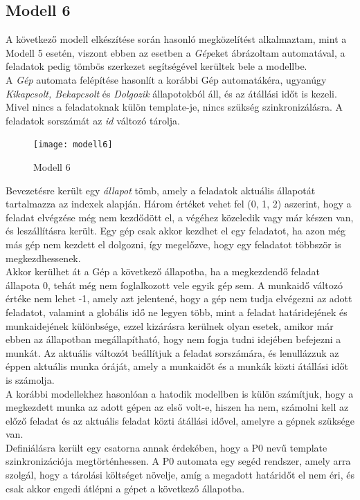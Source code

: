 \documentclass [12pt]{report}
\begin{document}
\subsection{Modell 6}
A következő modell elkészítése során hasonló megközelítést alkalmaztam, mint a Modell 5 esetén, viszont ebben az esetben a \emph{Gép}eket ábrázoltam automatával, a feladatok pedig tömbös szerkezet segítségével kerültek bele a modellbe.\\
A \emph{Gép} automata felépítése hasonlít a korábbi Gép automatákéra, ugyanúgy \emph{Kikapcsolt, Bekapcsolt} és \emph{Dolgozik} állapotokból áll, és az átállási időt is kezeli. Mivel nincs a feladatoknak külön template-je, nincs szükség szinkronizálásra. A feladatok sorszámát az \emph{id} változó tárolja.\\
\begin{figure}[htpb]
\begin{center}
\texttt{[image: modell6]}
\caption{Modell 6}
\end{center}
\end{figure}
Bevezetésre került egy \emph{állapot} tömb, amely a feladatok aktuális állapotát tartalmazza az indexek alapján. Három értéket vehet fel (0, 1, 2) aszerint, hogy a feladat elvégzése még nem kezdődött el, a végéhez közeledik vagy már készen van, és leszállításra került. Egy gép csak akkor kezdhet el egy feladatot, ha azon még más gép nem kezdett el dolgozni, így megelőzve, hogy egy feladatot többször is megkezdhessenek. \\
Akkor kerülhet át a Gép a következő állapotba, ha a megkezdendő feladat állapota 0, tehát még nem foglalkozott vele egyik gép sem. A munkaidő változó értéke nem lehet -1, amely azt jelentené, hogy a gép nem tudja elvégezni az adott feladatot, valamint a globális idő ne legyen több, mint a feladat határidejének és munkaidejének különbsége, ezzel kizárásra kerülnek olyan esetek, amikor már ebben az állapotban megállapítható, hogy nem fogja tudni idejében befejezni a munkát. Az aktuális változót beállítjuk a feladat sorszámára, és lenullázzuk az éppen aktuális munka óráját, amely a munkaidőt és a munkák közti átállási időt is számolja. \\
A korábbi modellekhez hasonlóan a hatodik modellben is külön számítjuk, hogy a megkezdett munka az adott gépen az első volt-e, hiszen ha nem, számolni kell az előző feladat és az aktuális feladat közti átállási idővel, amelyre a gépnek szüksége van.\\
Definiálásra került egy csatorna annak érdekében, hogy a P0 nevű template szinkronizációja megtörténhessen. A P0 automata egy segéd rendszer, amely arra szolgál, hogy a tárolási költséget növelje, amíg a megadott határidőt el nem éri, és csak akkor engedi átlépni a gépet a következő állapotba.
\end{document}
